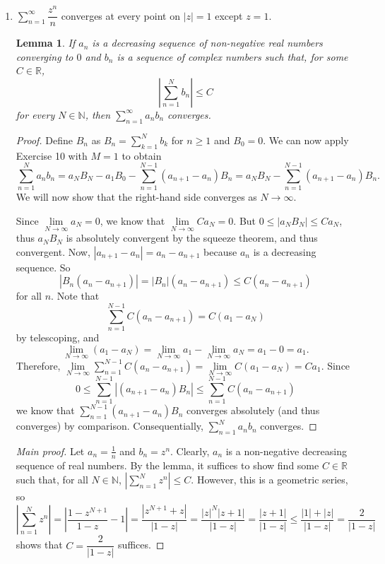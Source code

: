 \documentclass[10pt]{article}
\newcommand{\N}{\mathbb{N}}
\newcommand{\R}{\mathbb{R}}
\newtheorem*{lem}{Lemma}
\begin{document}
\begin{enumerate}
\begin{enumerate}
\item $\sum_{n=1}^\infty \dfrac{z^n}{n}$ converges at every point on $|z| = 1$ except $z=1$.
\begin{lem}
If $a_n$ is a decreasing sequence of non-negative real numbers converging to $0$ and $b_n$ is a sequence of complex numbers such that, for some $C \in \R$, $$\left| \sum\limits_{n=1}^N b_n \right| \leq C$$ for every $N \in \N$, then $\sum\limits_{n=1}^\infty a_n b_n$ converges.
\end{lem}
\begin{proof}
Define $B_n$ as $B_n = \sum_{k=1}^Nb_k$ for $n \geq 1$ and $B_0 = 0$.  We can now apply Exercise 10 with $M = 1$ to obtain
$$
\sum_{n=1}^N a_n b_n = a_N B_N - a_1 B_0 - \sum_{n=1}^{N-1} (a_{n+1} - a_n)B_n
=
a_N B_N - \sum_{n=1}^{N-1} (a_{n+1} - a_n)B_n.
$$
We will now show that the right-hand side converges as $N \rightarrow \infty$.

Since $\lim\limits_{N \rightarrow \infty} a_N = 0$, we know that $\lim\limits_{N \rightarrow \infty} C a_N = 0$.  But $0 \leq |a_N B_N| \leq C a_N$, thus $a_N B_N$ is absolutely convergent by the squeeze theorem, and thus convergent.  Now, $|a_{n+1} - a_n| = a_n - a_{n+1}$ because $a_n$ is a decreasing sequence.  So $$|B_n(a_n - a_{n+1})| = |B_n|(a_n - a_{n+1}) \leq C(a_n - a_{n+1})$$ for all $n$.  Note that $$\sum_{n=1}^{N-1} C(a_n - a_{n+1}) = C(a_1- a_N)$$ by telescoping, and $$\lim\limits_{N \rightarrow \infty} (a_1 - a_N) = \lim\limits_{N \rightarrow \infty} a_1 - \lim\limits_{N \rightarrow \infty} a_N = a_1 - 0 = a_1.$$
Therefore, $\lim\limits_{N \rightarrow \infty} \sum\limits_{n=1}^{N-1} C(a_n - a_{n+1}) = \lim\limits_{N \rightarrow \infty} C(a_1 - a_N) = Ca_1$.  Since
$$
0 \leq
\sum_{n=1}^{N-1} |(a_{n+1} - a_n)B_n| \leq
\sum_{n=1}^{N-1} C(a_n - a_{n+1})
$$
we know that $\sum\limits_{n=1}^{N-1} (a_{n+1} - a_n)B_n$ converges absolutely (and thus converges) by comparison.  Consequentially, $\sum\limits_{n=1}^N a_n b_n$ converges.
\end{proof}
\begin{proof}[Main proof]
Let $a_n = \frac1n$ and $b_n = z^n$.  Clearly, $a_n$ is a non-negative decreasing sequence of real numbers.  By the lemma, it suffices to show find some $C \in \R$ such that, for all $N \in \N$, $\left| \sum\limits_{n=1}^N z^n \right| \leq C$.  However, this is a geometric series, so
$$
\left| \sum\limits_{n=1}^N z^n \right|
= \left| \frac{1 - z^{N+1}}{1-z} - 1 \right|
= \frac{|z^{N+1} + z|}{|1-z|}
= \frac{|z|^N|z+1|}{|1-z|}
= \frac{|z+1|}{|1-z|}
\leq \frac{|1| + |z|}{|1-z|} = \frac{2}{|1-z|}
$$
shows that $C = \dfrac{2}{|1-z|}$ suffices.
\end{proof}
\end{enumerate}


\end{enumerate}
\end{document}
